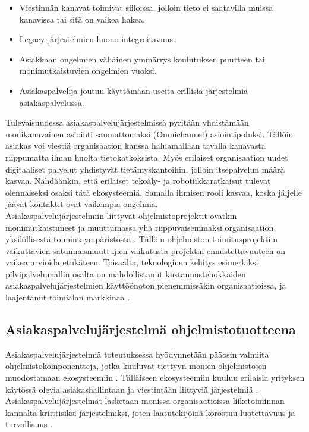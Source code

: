 \documentclass[finnish,12pt,a4paper,pdftex]{article}
\begin{document}
\begin{itemize}
\setlength{\itemsep}{0pt}
    \item Viestinnän kanavat toimivat siiloissa, jolloin tieto ei saatavilla muissa kanavissa tai sitä on vaikea hakea.
    \item Legacy-järjestelmien huono integroitavuus.
    \item Asiakkaan ongelmien vähäinen ymmärrys koulutuksen puutteen tai monimutkaistuvien ongelmien vuoksi.
    \item Asiakaspalvelija joutuu käyttämään useita erillisiä järjestelmiä asiakaspalvelussa. 
\end{itemize}

Tulevaisuudessa asiakaspalvelujärjestelmissä pyritään yhdistämään monikanavainen asiointi saumattomaksi (Omnichannel) asiointipoluksi. Tällöin asiakas voi viestiä organisaation kanssa haluamallaan tavalla kanavasta riippumatta ilman huolta tietokatkoksista. Myös erilaiset organisaation uudet digitaaliset palvelut yhdistyvät tietämyskantoihin, jolloin itsepalvelun määrä kasvaa. Nähdäänkin, että erilaiset tekoäly- ja robotiikkaratkaisut tulevat olennaiseksi osaksi tätä ekosysteemiä. Samalla ihmisen rooli kasvaa, koska jäljelle jäävät kontaktit ovat vaikempia ongelmia. \citep{ccgartner} \\

Asiakaspalvelujärjestelmiin liittyvät ohjelmistoprojektit ovatkin monimutkaistuneet ja muuttumassa yhä riippuvaisemmaksi organisaation yksilöllisestä toimintaympäristöstä \citep{ccinfo}. Tällöin ohjelmiston toimitusprojektiin vaikuttavien satunnaismuuttujien vaikutusta projektin ennustettavuuteen on vaikea arvioida etukäteen. Toisaalta, teknologinen kehitys esimerkiksi pilvipalvelumallin osalta on mahdollistanut kustannustehokkaiden asiakaspalvelujärjestelmien käyttöönoton pienemmissäkin organisaatioissa, ja laajentanut toimialan markkinaa \citep{ccgartner}.

\subsection{Asiakaspalvelujärjestelmä ohjelmistotuotteena}

Asiakaspalvelujärjestelmiä toteutuksessa hyödynnetään pääosin valmiita ohjelmistokomponentteja, jotka kuuluvat tiettyyn monien ohjelmistojen muodostamaan ekosysteemiin \citep{ccinfo}. Tälläiseen ekosysteemiin kuuluu erilaisia yrityksen käytössä olevia asiakashallintaan ja viestintään liittyviä järjestelmiä \citep{ccgartner}. Asiakaspalvelujärjestelmät lasketaan monissa organisaatioissa liiketoiminnan kannalta kriittisiksi järjestelmiksi, joten laatutekijöinä korostuu luotettavuus ja turvallisuus \citep{vcc}.  \\
\end{document}
